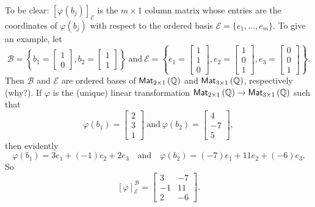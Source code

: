 \documentclass{memoir}
\begin{document}
To be clear: $[\varphi(b_j)]_{\mathcal{E}}$ is the $m \times 1$ column matrix whose entries are the coordinates of $\varphi(b_j)$ with respect to the ordered basis $\mathcal{E} = \{e_1,\ldots,e_m\}$. To give an example, let \[ \mathcal{B} = \left\{ b_1 = \begin{bmatrix} 1 \\ 0 \end{bmatrix}, b_2 = \begin{bmatrix} 1 \\ 1 \end{bmatrix} \right\}\ \mathrm{and}\ \mathcal{E} = \left\{ e_1 = \begin{bmatrix} 1 \\ 1 \\ 0 \end{bmatrix}, e_2 = \begin{bmatrix} 1 \\ 0 \\ 1 \end{bmatrix}, e_3 = \begin{bmatrix} 0 \\ 0 \\ 1 \end{bmatrix} \right\}. \] Then $\mathcal{B}$ and $\mathcal{E}$ are ordered bases of ${\mathsf{Mat}_{{2} \times {1}}}\left(\mathbb{Q}\right)$ and ${\mathsf{Mat}_{{3} \times {1}}}\left(\mathbb{Q}\right)$, respectively (why?). If $\varphi$ is the (unique) linear transformation ${\mathsf{Mat}_{{2} \times {1}}}\left(\mathbb{Q}\right) \rightarrow {\mathsf{Mat}_{{3} \times {1}}}\left(\mathbb{Q}\right)$ such that \[ \varphi(b_1) = \begin{bmatrix} 2 \\ 3 \\ 1 \end{bmatrix}\ \mathrm{and}\ \varphi(b_2) = \begin{bmatrix} 4 \\ -7 \\ 5 \end{bmatrix},\] then evidently \[ \varphi(b_1) = 3e_1 + (-1)e_2 + 2e_3 \quad \mathrm{and} \quad \varphi(b_2) = (-7)e_1 + 11e_2 + (-6)e_3. \] So \[ [\varphi]^\mathcal{B}_\mathcal{E} = \begin{bmatrix} 3 & -7 \\ -1 & 11 \\ 2 & -6 \end{bmatrix}. \]
\end{document}
